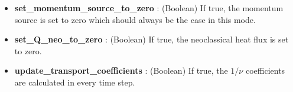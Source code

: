 \documentclass{article}
\begin{document}
\begin{itemize}
	\item \textbf{set\_momentum\_source\_to\_zero} : (Boolean) If true, the momentum source is set to zero which should always be the case in this mode.
	\item \textbf{set\_Q\_neo\_to\_zero} : (Boolean) If true, the neoclassical heat flux is set to zero.
	\item \textbf{update\_transport\_coefficients} : (Boolean) If true, the $1/\nu$ coefficients are calculated in every time step.
\end{itemize}
\end{document}
